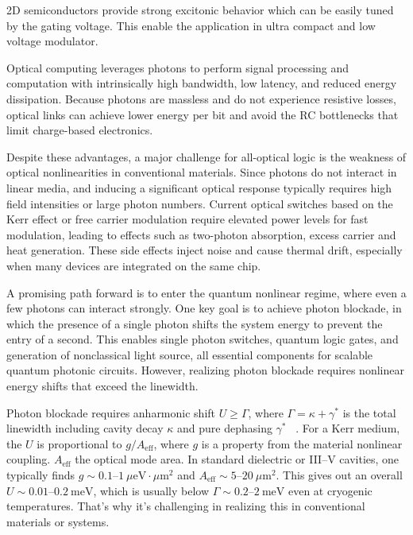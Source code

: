 2D semiconductors provide strong excitonic behavior which can be easily tuned by the gating voltage. 
This enable the application in ultra compact and low voltage modulator.

Optical computing leverages photons to perform signal processing and computation with intrinsically high bandwidth, low latency, and reduced energy dissipation\cite{Miller2010-nt}. 
Because photons are massless and do not experience resistive losses, optical links can achieve lower energy per bit and avoid the RC bottlenecks that limit charge-based electronics. 

Despite these advantages, a major challenge for all-optical logic is the weakness of optical nonlinearities in conventional materials\cite{Boyd2020-re}. 
Since photons do not interact in linear media, and inducing a significant optical response typically requires high field intensities or large photon numbers\cite{Chang2014-hk}. 
Current optical switches based on the Kerr effect or free carrier modulation require elevated power levels for fast modulation, leading to effects such as two-photon absorption, excess carrier and heat generation\cite{Miller2009-hw}.
These side effects inject noise and cause thermal drift, especially when many devices are integrated on the same chip.

A promising path forward is to enter the quantum nonlinear regime, where even a few photons can interact strongly. 
One key goal is to achieve photon blockade, in which the presence of a single photon shifts the system energy to prevent the entry of a second\cite{Imamoglu1997-pb}. 
This enables single photon switches, quantum logic gates, and generation of nonclassical light source, all essential components for scalable quantum photonic circuits\cite{Lodahl2015-el,Chang2014-hk}. 
However, realizing photon blockade requires nonlinear energy shifts that exceed the linewidth\cite{Carusotto2013-mf}. 

Photon blockade requires anharmonic shift $U \geq \Gamma$, where $\Gamma=\kappa+\gamma^\ast$ is the total linewidth including cavity decay $\kappa$ and pure dephasing $\gamma^\ast$~ \cite{Birnbaum2005-ix,Verger2006-jz}. 
For a Kerr medium, the $U$ is proportional to $g /A_{\mathrm{eff}}$, where $g$ is a property from the material nonlinear coupling. $A_{\mathrm{eff}}$ the optical mode area. 
In standard dielectric or III–V cavities, one typically finds $g \sim 0.1$–$1~\mu\mathrm{eV}\cdot\mu\mathrm{m}^2$ and $A_{\mathrm{eff}}\sim 5$–$20~\mu\mathrm{m}^2$.
This gives out an overall $U\sim 0.01$–$0.2~\mathrm{meV}$, which is usually below $\Gamma\sim 0.2$–$2~\mathrm{meV}$ even at cryogenic temperatures. 
That's why it's challenging in realizing this in conventional materials or systems.

